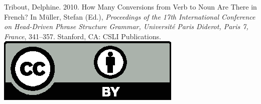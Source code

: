 \documentclass[11pt,a4paper,fleqn]{article}
\begin{document}
\noindent



\vfill
\noindent
Tribout, Delphine. 2010. How Many Conversions from Verb to Noun Are There in French? In Müller, Stefan (Ed.), \emph{{Proceedings of the 17th International Conference on Head-Driven Phrase Structure Grammar, Universit{\'e} Paris Diderot, Paris 7, France}}, 341--357. Stanford,
CA: CSLI Publications. \hfill\href{http://creativecommons.org/licenses/by/4.0/}{\includegraphics[height=.75em]{Includes/ccby.eps}}

\newpage

\end{document}
